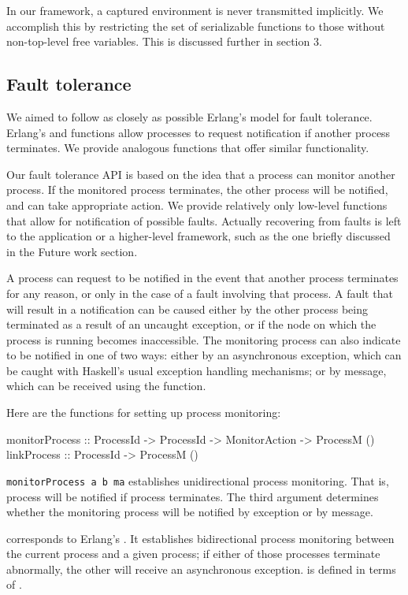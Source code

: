 \documentclass[preprint]{sigplanconf}
\begin{document}
In our framework, a captured environment is never transmitted implicitly. We accomplish this by restricting the set of serializable functions to those without non-top-level free variables. This is discussed further in section 3.

\subsection{Fault tolerance}
We aimed to follow as closely as possible Erlang's model for fault tolerance. Erlang's  and  functions allow processes to request notification if another process terminates. We provide analogous functions that offer similar functionality.

Our fault tolerance API is based on the idea that a process can monitor another process. If the monitored process terminates, the other process will be notified, and can take appropriate action. We provide relatively only low-level functions that allow for notification of possible faults. Actually recovering from faults is left to the application or a higher-level framework, such as the one briefly discussed in the Future work section.

A process can request to be notified in the event that another process terminates for any reason, or only in the case of a fault involving that process. A fault that will result in a notification can be caused either by the other process being terminated as a result of an uncaught exception, or if the node on which the process is running becomes inaccessible. The monitoring process can also indicate to be notified in one of two ways: either by an asynchronous exception, which can be caught with Haskell's usual exception handling mechanisms; or by message, which can be received using the  function.

Here are the functions for setting up process monitoring:

\begin{code}
monitorProcess :: ProcessId -> ProcessId -> MonitorAction -> ProcessM ()
linkProcess :: ProcessId -> ProcessM ()
\end{code}

\lstinline!monitorProcess a b ma! establishes unidirectional process monitoring. That is, process  will be notified if process  terminates. The third argument determines whether the monitoring process will be notified by exception or by message.

 corresponds to Erlang's . It establishes bidirectional process monitoring between the current process and a given process; if either of those processes terminate abnormally, the other will receive an asynchronous exception.  is defined in terms of . 
\end{document}
